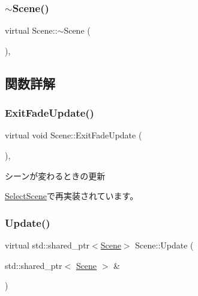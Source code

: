 \subsubsection{\texorpdfstring{$\sim$\+Scene()}{~Scene()}}
{\footnotesize\ttfamily virtual Scene\+::$\sim$\+Scene (\begin{DoxyParamCaption}{ }\end{DoxyParamCaption})\hspace{0.3cm}{\ttfamily [inline]}, {\ttfamily [virtual]}}



\subsection{関数詳解}
\mbox{\label{class_scene_ad19a449c6ed452823dae14183689570c}} 
\subsubsection{\texorpdfstring{Exit\+Fade\+Update()}{ExitFadeUpdate()}}
{\footnotesize\ttfamily virtual void Scene\+::\+Exit\+Fade\+Update (\begin{DoxyParamCaption}{ }\end{DoxyParamCaption})\hspace{0.3cm}{\ttfamily [inline]}, {\ttfamily [virtual]}}



シーンが変わるときの更新 



\mbox{\hyperlink{class_select_scene_a546190bc143f6d7a3055935f97b55596}{Select\+Scene}}で再実装されています。

\mbox{\label{class_scene_ab71ee5f19764b90c87b4574aa1cb1d25}} 
\subsubsection{\texorpdfstring{Update()}{Update()}}
{\footnotesize\ttfamily virtual std\+::shared\+\_\+ptr$<$\mbox{\hyperlink{class_scene}{Scene}}$>$ Scene\+::\+Update (\begin{DoxyParamCaption}\item[{std\+::shared\+\_\+ptr$<$ \mbox{\hyperlink{class_scene}{Scene}} $>$ \&}]{ }\end{DoxyParamCaption})\hspace{0.3cm}{\ttfamily [pure virtual]}}



